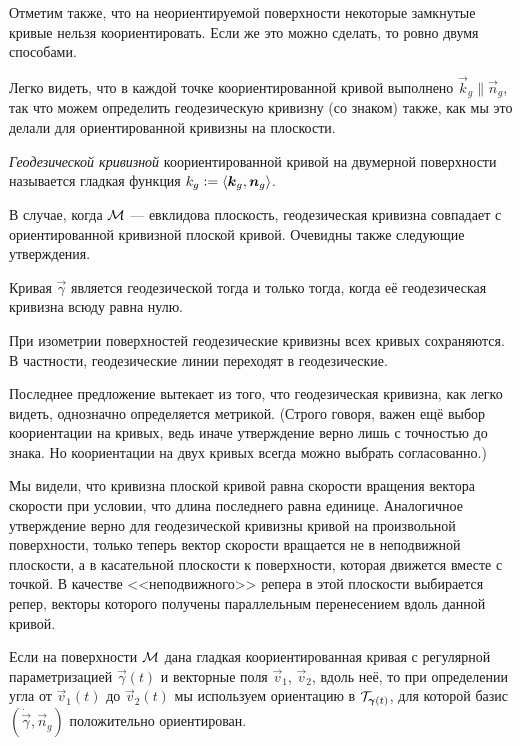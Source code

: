 Отметим также, что на неориентируемой поверхности некоторые замкнутые кривые нельзя коориентировать. Если же это можно сделать, то ровно двумя способами.

Легко видеть, что в каждой точке коориентированной кривой выполнено $\vec{k}_g \parallel \vec{n}_g$, так что можем определить геодезическую кривизну (со знаком) также, как мы это делали для ориентированной кривизны на плоскости.

\begin{definition}
	\textit{Геодезической кривизной} коориентированной кривой на двумерной поверхности называется гладкая функция $k_g\vcentcolon = \langle\vec{k}_g, \vec{n}_g\rangle$.
\end{definition}

В случае, когда $\M$ --- евклидова плоскость, геодезическая кривизна совпадает с ориентированной кривизной плоской кривой. Очевидны также следующие утверждения.

\begin{proposition}
	Кривая $\vec{\gamma}$ является геодезической тогда и только тогда, когда её геодезическая кривизна всюду равна нулю.
\end{proposition}

\begin{proposition}
	При изометрии поверхностей геодезические кривизны всех кривых сохраняются. В частности, геодезические линии переходят в геодезические.
\end{proposition}

Последнее предложение вытекает из того, что геодезическая кривизна, как легко видеть, однозначно определяется метрикой. (Строго говоря, важен ещё выбор коориентации на кривых, ведь иначе утверждение верно лишь с точностью до знака. Но коориентации на двух кривых всегда можно выбрать согласованно.)

Мы видели, что кривизна плоской кривой равна скорости вращения вектора скорости при условии, что длина последнего равна единице. Аналогичное утверждение верно для геодезической кривизны кривой на произвольной поверхности, только теперь вектор скорости вращается не в неподвижной плоскости, а в касательной плоскости к поверхности, которая движется вместе с точкой. В качестве <<неподвижного>> репера в этой плоскости выбирается репер, векторы которого получены параллельным перенесением вдоль данной кривой.

Если на поверхности $\M$ дана гладкая коориентированная кривая с регулярной параметризацией $\vec{\gamma}(t)$ и векторные поля $\vec{v}_1$, $\vec{v}_2$, вдоль неё, то при определении угла от $\vec{v}_1(t)$ до $\vec{v}_2(t)$ мы используем ориентацию в $\T_{\vec{\gamma}(t)}$, для которой базис $(\dot{\vec{\gamma}}, \vec{n}_g)$ положительно ориентирован\footnotemark{}.

